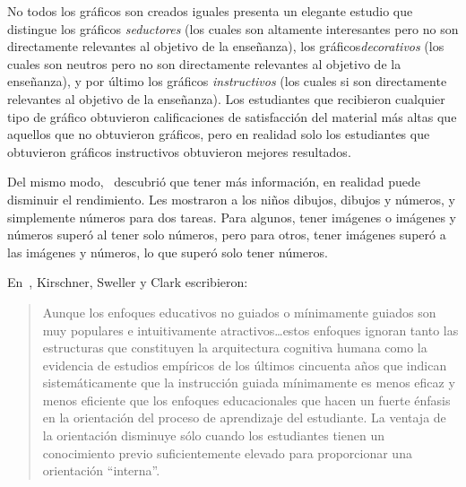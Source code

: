 \begin{aside}{No todos los gráficos son creados iguales}
  \cite{Sung2012} presenta un elegante estudio que distingue los gráficos \emph{seductores} 
  (los cuales son altamente interesantes pero no son directamente relevantes al objetivo de la enseñanza), 
  los gráficos\emph{decorativos}
  (los cuales son neutros pero no son directamente relevantes al objetivo de la enseñanza), 
  y por último
  los gráficos \emph{instructivos} 
  (los cuales si son directamente relevantes al objetivo de la enseñanza). 
  Los estudiantes que recibieron cualquier tipo de gráfico obtuvieron calificaciones de satisfacción 
  del material más altas que aquellos que no obtuvieron gráficos, 
  pero en realidad solo los estudiantes que obtuvieron gráficos instructivos obtuvieron mejores resultados.


  Del mismo modo,~\cite{Stam2013,Stam2014} descubrió que 
  tener más información, en realidad puede disminuir el rendimiento. 
  Les mostraron a los niños dibujos, dibujos y números, y simplemente números 
  para dos tareas. 
  Para algunos, tener imágenes o imágenes y números superó al tener solo números, 
  pero para otros, tener imágenes superó a las imágenes y números, 
  lo que superó solo tener números.
\end{aside}


En~\cite{Kirs2006}, Kirschner, Sweller y Clark escribieron:

\begin{quote}
 
  Aunque los enfoques educativos no guiados o mínimamente guiados son muy    
  populares e intuitivamente atractivos{\ldots}estos enfoques ignoran tanto 
  las estructuras que constituyen la arquitectura cognitiva humana como 
  la evidencia de estudios empíricos de los últimos cincuenta años que indican 
  sistemáticamente que la instrucción guiada mínimamente es menos eficaz y 
  menos eficiente que los enfoques educacionales que hacen un fuerte énfasis 
  en la orientación del proceso de aprendizaje del estudiante.
  La ventaja de la orientación disminuye sólo cuando los estudiantes 
  tienen un conocimiento previo suficientemente elevado para proporcionar una orientación ``interna''.
\end{quote}

